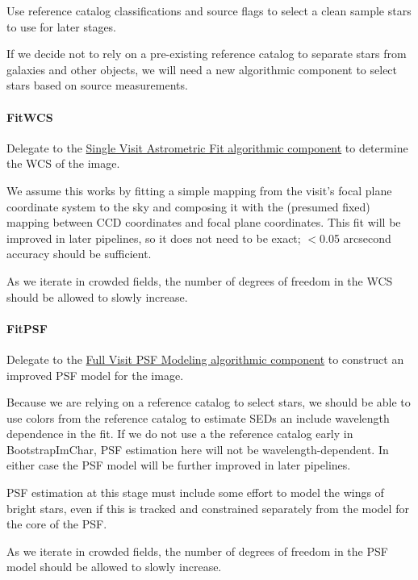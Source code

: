 Use reference catalog classifications and source flags to select a clean sample stars to use for later stages.

If we decide not to rely on a pre-existing reference catalog to separate stars from galaxies and other objects, we will need a new algorithmic component to select stars based on source measurements.

\paragraph{FitWCS}
\label{sec:drpBootstrapImChar_FitWCS}

Delegate to the \hyperref[sec:acSingleVisitAstrometricFit]{Single Visit Astrometric Fit algorithmic component} to determine the WCS of the image.

We assume this works by fitting a simple mapping from the visit's focal plane coordinate system to the sky and composing it with the (presumed fixed) mapping between CCD coordinates and focal plane coordinates.  This fit will be improved in later pipelines, so it does not need to be exact; $<$0.05 arcsecond accuracy should be sufficient.

As we iterate in crowded fields, the number of degrees of freedom in the WCS should be allowed to slowly increase.

\paragraph{FitPSF}
\label{sec:drpBootstrapImChar_FitPSF}

Delegate to the \hyperref[sec:acFullVisitPSF]{Full Visit PSF Modeling algorithmic component} to construct an improved PSF model for the image.

Because we are relying on a reference catalog to select stars, we should be able to use colors from the reference catalog to estimate SEDs an include wavelength dependence in the fit.  If we do not use a the reference catalog early in BootstrapImChar, PSF estimation here will not be wavelength-dependent.  In either case the PSF model will be further improved in later pipelines.

PSF estimation at this stage must include some effort to model the wings of bright stars, even if this is tracked and constrained separately from the model for the core of the PSF.

As we iterate in crowded fields, the number of degrees of freedom in the PSF model should be allowed to slowly increase.

